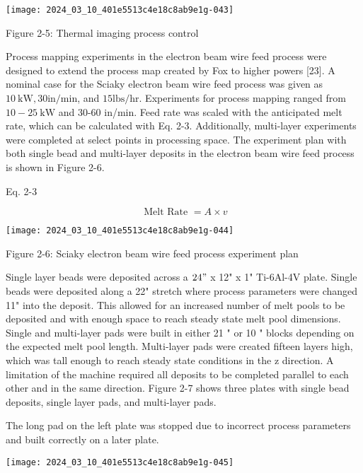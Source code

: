 \documentclass[10pt]{article}
\begin{document}
\begin{center}
\texttt{[image: 2024\_03\_10\_401e5513c4e18c8ab9e1g-043]}
\end{center}

Figure 2-5: Thermal imaging process control

Process mapping experiments in the electron beam wire feed process were designed to extend the process map created by Fox to higher powers [23]. A nominal case for the Sciaky electron beam wire feed process was given as $10 \mathrm{~kW}, 30 \mathrm{in} / \mathrm{min}$, and $15 \mathrm{lbs} / \mathrm{hr}$. Experiments for process mapping ranged from $10-25 \mathrm{~kW}$ and 30-60 in/min. Feed rate was scaled with the anticipated melt\\
rate, which can be calculated with Eq. 2-3. Additionally, multi-layer experiments were completed at select points in processing space. The experiment plan with both single bead and multi-layer deposits in the electron beam wire feed process is shown in Figure 2-6.

Eq. 2-3

$$
\text { Melt Rate }=A \times v
$$

\begin{center}
\texttt{[image: 2024\_03\_10\_401e5513c4e18c8ab9e1g-044]}
\end{center}

Figure 2-6: Sciaky electron beam wire feed process experiment plan

Single layer beads were deposited across a $24 "$ x 12" x 1" Ti-6Al-4V plate. Single beads were deposited along a 22" stretch where process parameters were changed 11" into the deposit. This allowed for an increased number of melt pools to be deposited and with enough space to reach steady state melt pool dimensions. Single and multi-layer pads were built in either 21 " or 10 " blocks depending on the expected melt pool length. Multi-layer pads were created fifteen layers high, which was tall enough to reach steady state conditions in the $\mathrm{z}$ direction. A limitation of the machine required all deposits to be completed parallel to each other and in the same direction. Figure 2-7 shows three plates with single bead deposits, single layer pads, and multi-layer pads.

The long pad on the left plate was stopped due to incorrect process parameters and built correctly on a later plate.

\begin{center}
\texttt{[image: 2024\_03\_10\_401e5513c4e18c8ab9e1g-045]}
\end{center}
\end{document}
